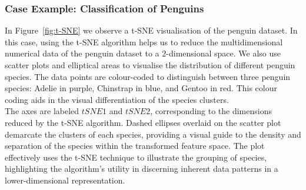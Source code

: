 \documentclass{article}\usepackage[]{graphicx}\usepackage[]{xcolor}
\numberwithin{equation}{section}
\begin{document}
\subsubsection{Case Example: Classification of Penguins}

In Figure~\ref{fig:t-SNE} we observe a t-SNE visualisation of the penguin dataset. In this case, using the t-SNE algorithm helps us to reduce the multidimensional numerical data of the penguin dataset to a $2$-dimensional space. We also use scatter plots and elliptical areas to visualise the distribution of different penguin species. The data points are colour-coded to distinguish between three penguin species: Adelie in purple, Chinstrap in blue, and Gentoo in red. This colour coding aids in the visual differentiation of the species clusters.\\

\noindent
The axes are labeled $tSNE1$ and $tSNE2$, corresponding to the dimensions reduced by the t-SNE algorithm. Dashed ellipses overlaid on the scatter plot demarcate the clusters of each species, providing a visual guide to the density and separation of the species within the transformed feature space. The plot effectively uses the t-SNE technique to illustrate the grouping of species, highlighting the algorithm's utility in discerning inherent data patterns in a lower-dimensional representation.\\
\end{document}
